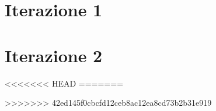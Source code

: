 \documentclass[12pt]{article}   %
\begin{document}
\newpage
\section{Iterazione 1}


\newpage

\newpage

\newpage


\newpage
\section{Iterazione 2}

<<<<<<< HEAD
=======
\newpage

>>>>>>> 42ed145f0cbcfd12ceb8ac12ea8cd73b2b31e919
\newpage

\newpage

\end{document}
